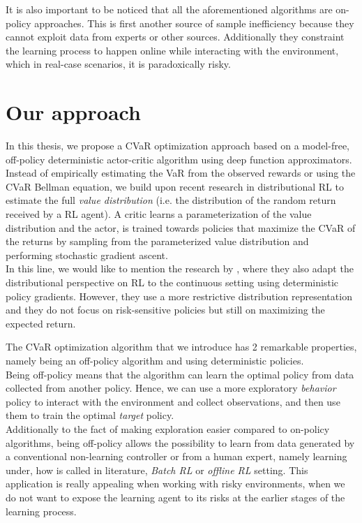 It is also important to be noticed that all the aforementioned algorithms are on-policy approaches.
This is first another source of sample inefficiency
because they cannot exploit data from experts or other sources. Additionally they
constraint the learning process to happen online while interacting with the environment,
which in real-case scenarios, it is paradoxically risky.


\section{Our approach}

In this thesis, we propose a CVaR optimization approach based on a model-free, off-policy
deterministic actor-critic algorithm using deep function approximators. 
Instead of empirically estimating the VaR from the observed rewards or using the CVaR
Bellman equation, we build upon recent research in distributional RL 
\citep{Bellemare2017,Dabney2018a,Dabney2018b}
to estimate the full
\textit{value distribution} (i.e. the distribution of the random return received by a RL agent).
A critic learns a parameterization of the value distribution and 
the actor, is trained towards policies that maximize the CVaR of the returns 
by sampling from the parameterized value distribution and performing stochastic gradient ascent.\\
In this line, we would like to mention the research by \citet{BarthMaron2018}, where they also adapt
the distributional perspective on RL to the continuous setting using deterministic policy gradients.
However, they use a more restrictive distribution representation and they do not focus on risk-sensitive
policies but still on maximizing the expected return.


The CVaR optimization algorithm that we introduce has 2 remarkable properties, 
namely being an off-policy algorithm and using deterministic policies.\\
Being off-policy means that the algorithm can learn the optimal policy from data collected
from another policy. Hence, we can use a more exploratory \textit{behavior} policy to interact
with the environment and collect observations, and then use them to train
the optimal \textit{target} policy. \\
Additionally to the fact of making exploration easier compared to on-policy algorithms,
being off-policy allows the possibility to learn from data generated by a conventional
non-learning controller or from a human expert, namely learning under, how is called in
literature, \textit{Batch RL} or \textit{offline RL} setting.
This application is really appealing when working with risky environments, when we do
not want to expose the learning agent to its risks at the earlier stages of the learning
process.

